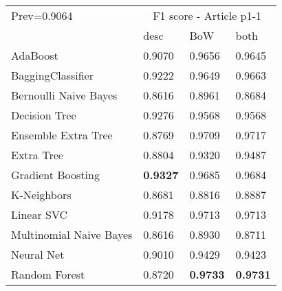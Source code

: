 \begin{tabular}{|l|l|l|l| }
\hline
Prev=0.9064 &  \multicolumn{3}{c|}{F1 score - Article p1-1} \\
\cline{2-4} & desc & BoW & both \\ \hline
AdaBoost                & 0.9070 & 0.9656 & 0.9645\\
BaggingClassifier       & 0.9222 & 0.9649 & 0.9663\\
Bernoulli Naive Bayes   & 0.8616 & 0.8961 & 0.8684\\
Decision Tree           & 0.9276 & 0.9568 & 0.9568\\
Ensemble Extra Tree     & 0.8769 & 0.9709 & 0.9717\\
Extra Tree              & 0.8804 & 0.9320 & 0.9487\\
Gradient Boosting       & {\bf 0.9327} & 0.9685 & 0.9684\\
K-Neighbors             & 0.8681 & 0.8816 & 0.8887\\
Linear SVC              & 0.9178 & 0.9713 & 0.9713\\
Multinomial Naive Bayes & 0.8616 & 0.8930 & 0.8711\\
Neural Net              & 0.9010 & 0.9429 & 0.9423\\
Random Forest           & 0.8720 & {\bf 0.9733} & {\bf 0.9731}\\
\hline
\end{tabular}